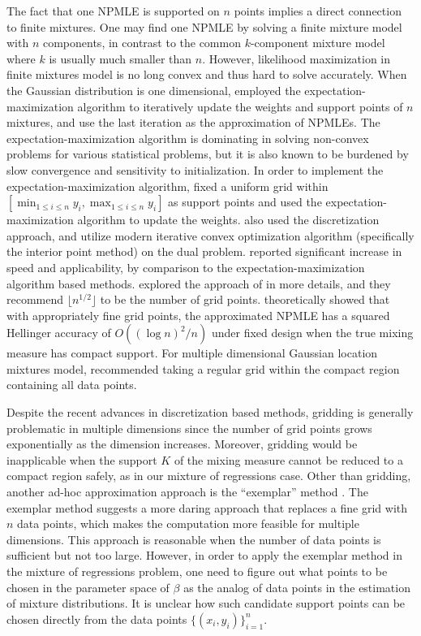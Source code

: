 \documentclass[11pt]{article}
\numberwithin{equation}{section}
\newcommand{\EM}{expectation-maximization }
\begin{document}
The fact that one NPMLE is supported on $n$ points implies a direct connection to finite mixtures. One may find one NPMLE by solving a finite mixture model with $n$ components, in contrast to the common $k$-component mixture model where $k$ is usually much smaller than $n$. However, likelihood maximization in finite mixtures model is no long convex and thus hard to solve accurately. When the Gaussian distribution is one dimensional, \citet{jiang2009general} employed the \EM algorithm to iteratively update the weights and support points of $n$ mixtures, and use the last iteration as the approximation of NPMLEs.  The \EM algorithm is dominating in solving non-convex problems for various statistical problems, but it is also known to be burdened by slow convergence and sensitivity to initialization. In order to implement the \EM algorithm, \citet{jiang2009general} fixed a uniform grid within $[\min_{1\leq i \leq n} y_i, \max_{1 \leq i \leq n} y_i]$ as support points and used the \EM algorithm to update the weights. \citet{koenker2014convex} also used the discretization approach, and \citet{koenker2014convex} utilize modern iterative convex optimization algorithm (specifically the interior point method) on the dual problem. \citet{koenker2014convex} reported significant increase in speed and applicability, by comparison to the \EM algorithm based methods. \citet{dicker2016high} explored the approach of \citet{koenker2014convex} in more details, and they recommend $\lfloor n^{1/2}\rfloor$ to be the number of grid points. \citet{dicker2016high} theoretically showed that with appropriately fine grid points, the approximated NPMLE has a squared Hellinger accuracy of $O((\log n)^2/n)$ under fixed design when the true mixing measure has compact support. For multiple dimensional Gaussian location mixtures model, \citet{feng2018approximate} recommended taking a regular grid within the compact region containing all data points.

Despite the recent advances in discretization based methods, gridding is generally problematic in multiple dimensions since the number of grid points grows exponentially as the dimension increases. Moreover, gridding would be inapplicable when the support $K$ of the mixing measure cannot be reduced to a compact region safely, as in our mixture of regressions case. Other than gridding, another ad-hoc approximation approach is the ``exemplar'' method \citep{bohning2000computer,lashkari2008convex,saha2020nonparametric}. The exemplar method suggests a more daring approach that replaces a fine grid with $n$ data points, which makes the computation more feasible for multiple dimensions. This approach is reasonable when the number of data points is sufficient but not too large. However, in order to apply the exemplar method in the mixture of regressions problem, one need to figure out what points to be chosen in the parameter space of $\beta$ as the analog of data points in the estimation of mixture distributions. It is unclear how such candidate support points can be chosen directly from the data points $\{(x_i,y_i)\}_{i=1}^n$.
\end{document}

